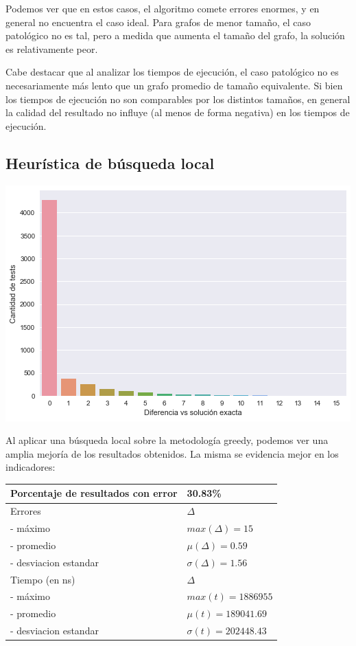 Podemos ver que en estos casos, el algoritmo comete errores enormes, y en general no encuentra el caso ideal. Para grafos de menor tamaño, el caso patológico no es tal, pero a medida que aumenta el tamaño del grafo, la solución es relativamente peor.

Cabe destacar que al analizar los tiempos de ejecución, el caso patológico no es necesariamente más lento que un grafo promedio de tamaño equivalente. Si bien los tiempos de ejecución no son comparables por los distintos tamaños, en general la calidad del resultado no influye (al menos de forma negativa) en los tiempos de ejecución. 

\subsection*{Heurística de búsqueda local}

\begin{center}
    \includegraphics[scale=0.6]{img/accuracy-local.png}
\end{center}

Al aplicar una búsqueda local sobre la metodología greedy, podemos ver una amplia mejoría de los resultados obtenidos. La misma se evidencia mejor en los indicadores:

\begin{center}
    \begin{tabular}{ | l l |}
        \hline
        Porcentaje de resultados con error & 30.83\% \\ \hline
        Errores & $\Delta$ \\
        - máximo & $max(\Delta) = 15$ \\
        - promedio & $\mu(\Delta) = 0.59$ \\
        - desviacion estandar & $\sigma(\Delta) = 1.56$ \\ \hline
        Tiempo (en ns) & $\Delta$ \\
        - máximo & $max(t) = 1886955 $ \\
        - promedio & $\mu(t) = 189041.69$ \\
        - desviacion estandar & $\sigma(t) = 202448.43$ \\
        \hline
    \end{tabular}
\end{center}


